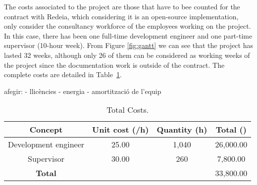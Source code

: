 
The costs associated to the project are those that have to bee counted for the contract with Redeia, which considering it is an open-source implementation, only consider the consultancy workforce of the employees working on the project. In 
this case, there has been one full-time development engineer and one part-time supervisor (10-hour week). 
From Figure \ref{fig:gantt} we can see that the project has lasted 32 weeks, although only 26 of them can be considered as working weeks of the project since the documentation
work is outside of the contract.
The complete costs are detailed in Table~\ref{tab:equip}.

afegir:
- llicències
- energia 
- amortització de l'equip


\begin{table}[!htb]\centering
	\caption{Total Costs.}
	\begin{tabular}{ccc|c}
		\hline
		\textbf{Concept} & \textbf{Unit cost (\texteuro/h)} & \textbf{Quantity (h)} & \textbf{Total (\texteuro)} \\
		\hline
		\hline
		Development engineer & 25.00 & 1,040 & 26,000.00 \\ 
		Supervisor & 30.00 & 260 & 7,800.00 \\
		\hline
		\textbf{Total} & & & 33,800.00 \\
		\hline
	\end{tabular}
	\label{tab:equip}
\end{table}


